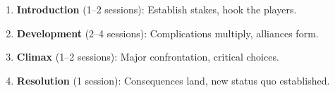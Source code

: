 \begin{tcolorbox}[title=Campaign Pacing (Arc Structure), colback=white!97!gray, colframe=black!80!gray,breakable]
\begin{enumerate}
  \item \textbf{Introduction} (1--2 sessions): Establish stakes, hook the players.
  \item \textbf{Development} (2--4 sessions): Complications multiply, alliances form.
  \item \textbf{Climax} (1--2 sessions): Major confrontation, critical choices.
  \item \textbf{Resolution} (1 session): Consequences land, new status quo established.
\end{enumerate}
\end{tcolorbox}
